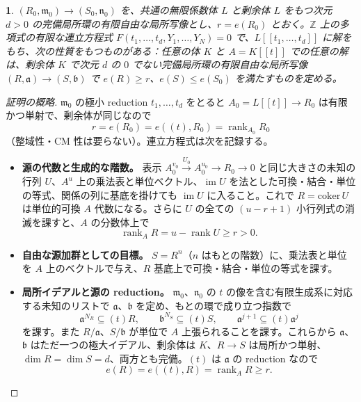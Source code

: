 \documentclass[11pt,a4paper]{ltjsarticle}
\newcommand{\stmtname}{}
\theoremstyle{plain}
\newtheorem*{stmtgen}{\stmtname}
\newenvironment{stmt}[1]{\renewcommand{\stmtname}{#1}\begin{stmtgen}}{\end{stmtgen}}
\theoremstyle{definition}
\newcommand{\m}{\mathfrak{m}}
\newcommand{\n}{\mathfrak{n}}
\newcommand{\bb}{\mathfrak{b}}
\newcommand{\rank}{\operatorname{rank}}
\newcommand{\im}{\operatorname{im}}
\newcommand{\Z}{\mathbb{Z}}
\begin{document}
\begin{stmt}{補題 7.2}
$(R_0,\m_0)\to(S_0,\n_0)$ を、共通の無限係数体 $L$ と剰余体 $L$ をもつ次元 $d>0$ の完備局所環の有限自由な局所写像とし、$r = e(R_0)$ とおく。$\Z$ 上の多項式の有限な連立方程式
$F(t_1,\dots,t_d,Y_1,\dots,Y_N) = 0$
で、$L[[t_1,\dots,t_d]]$ に解をもち、次の性質をもつものがある：任意の体 $K$ と $A = K[[t]]$ での任意の解は、剰余体 $K$ で次元 $d$ の $0$ でない完備局所環の有限自由な局所写像 $(R,\mathfrak{a})\to(S,\bb)$ で $e(R)\ge r$、$e(S)\le e(S_0)$ を満たすものを定める。
\end{stmt}
\begin{proof}[証明の概略]
$\m_0$ の極小 reduction $t_1,\dots,t_d$ をとると $A_0 = L[[t]]\to R_0$ は有限かつ単射で、剰余体が同じなので
\begin{equation}\tag{7.1}
  r = e(R_0) = e((t),R_0) = \rank_{A_0}R_0
\end{equation}
（整域性・CM 性は要らない）。連立方程式は次を記録する。
\begin{itemize}
  \item \textbf{源の代数と生成的な階数。} 表示 $A_0^{v_0}\xrightarrow{U_0}A_0^{u_0}\to R_0\to0$ と同じ大きさの未知の行列 $U$、$A^u$ 上の乗法表と単位ベクトル、$\im U$ を法とした可換・結合・単位の等式、関係の列に基底を掛けても $\im U$ に入ること。これで $R = \mathrm{coker}\,U$ は単位的可換 $A$ 代数になる。さらに $U$ の全ての $(u-r+1)$ 小行列式の消滅を課すと、$A$ の分数体上で
  \begin{equation}\tag{7.2}
    \rank_AR = u-\rank U\ge r>0.
  \end{equation}
  \item \textbf{自由な源加群としての目標。} $S = R^n$（$n$ はもとの階数）に、乗法表と単位を $A$ 上のベクトルで与え、$R$ 基底上で可換・結合・単位の等式を課す。
  \item \textbf{局所イデアルと源の reduction。} $\m_0$、$\n_0$ の $t$ の像を含む有限生成系に対応する未知のリストで $\mathfrak{a}$、$\bb$ を定め、もとの環で成り立つ指数で
  \begin{equation}\tag{7.3}
    \mathfrak{a}^{N_R}\subseteq(t)R,\qquad\bb^{N_S}\subseteq(t)S,\qquad\mathfrak{a}^{j+1}\subseteq(t)\mathfrak{a}^j
  \end{equation}
  を課す。また $R/\mathfrak{a}$、$S/\bb$ が単位で $A$ 上張られることを課す。これらから $\mathfrak{a}$、$\bb$ はただ一つの極大イデアル、剰余体は $K$、$R\to S$ は局所かつ単射、$\dim R = \dim S = d$、両方とも完備。$(t)$ は $\mathfrak{a}$ の reduction なので
  \begin{equation}\tag{7.4}
    e(R) = e((t),R) = \rank_AR\ge r.

\end{equation}
\end{itemize}
\end{proof}
\end{document}
